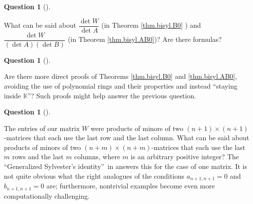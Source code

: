 \documentclass[numbers=enddot,12pt,final,onecolumn,notitlepage]{scrartcl}%
\theoremstyle{definition}
\newtheorem{questn}[theo]{Question}
\newenvironment{quest}[1][]
{\begin{questn}[#1]\begin{leftbar}}
{\end{leftbar}\end{questn}}
\newenvironment{quest}[1][Question]{\noindent\textbf{#1.} }{\ \rule{0.5em}{0.5em}}
\begin{document}
\begin{quest}
What can be said about $\dfrac{\det W}{\det A}$ (in Theorem \ref{thm.bisyl.B0}%
) and $\dfrac{\det W}{\left(  \det A\right)  \left(  \det B\right)  }$ (in
Theorem \ref{thm.bisyl.AB0})? Are there formulas?
\end{quest}

\begin{quest}
Are there more direct proofs of Theorems \ref{thm.bisyl.B0} and
\ref{thm.bisyl.AB0}, avoiding the use of polynomial rings and their properties
and instead \textquotedblleft staying inside $\mathbb{K}$\textquotedblright?
Such proofs might help answer the previous question.
\end{quest}

\begin{quest}
The entries of our matrix $W$ were products of minors of two $\left(
n+1\right)  \times\left(  n+1\right)  $-matrices that each use the last row
and the last column. What can be said about products of minors of two $\left(
n+m\right)  \times\left(  n+m\right)  $-matrices that each use the last $m$
rows and the last $m$ columns, where $m$ is an arbitrary positive integer? The
\textquotedblleft Generalized Sylvester's identity\textquotedblright\ in
\cite[\S 2.7]{Prasolov} answers this for the case of one matrix. It is not
quite obvious what the right analogues of the conditions $a_{n+1,n+1}=0$ and
$b_{n+1,n+1}=0$ are; furthermore, nontrivial examples become even more
computationally challenging.
\end{quest}
\end{document}
